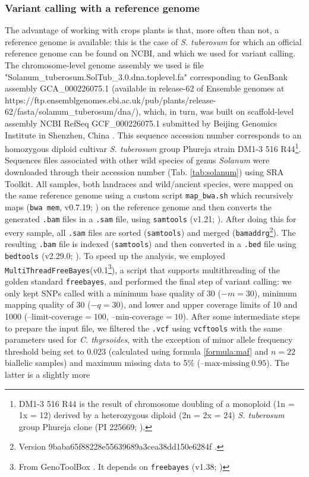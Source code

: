 \documentclass[a4paper, 12pt]{report}
\begin{document}
\subsubsection{Variant calling with a reference genome}
The advantage of working with crops plants is that, more often than not, a reference genome is available: this is the case of \textit{S. tuberosum} for which an official reference genome can be found on NCBI, and which we used for variant calling. The chromosome-level genome assembly we used is file "Solanum\_tuberosum.SolTub\_3.0.dna.toplevel.fa" corresponding to GenBank assembly GCA\_000226075.1 (available in release-62 of Ensemble genomes at https://ftp.ensemblgenomes.ebi.ac.uk/pub/plants/release-62/fasta/solanum\_tuberosum/dna/), which, in turn, was built on scaffold-level assembly NCBI RefSeq GCF\_000226075.1 submitted by Beijing Genomics Institute in Shenzhen, China \parencite{xuGenomeSequenceAnalysis2011}. This sequence accession number corresponds to an homozygous diploid cultivar \textit{S. tuberosum} group Phureja strain DM1-3 516 R44\footnote{DM1-3 516 R44 is the result of chromosome doubling of a monoploid (1n = 1x = 12) derived by a heterozygous diploid (2n = 2x = 24) \textit{S. tuberosum} group Phureja clone (PI 225669; \cite{xuGenomeSequenceAnalysis2011}).}. Sequences files associated with other wild species of genus \textit{Solanum} were downloaded through their accession number (Tab. \ref{tab:solanum}) using SRA Toolkit. All samples, both landraces and wild/ancient species, were mapped on the same reference genome using a custom script \texttt{map\_bwa.sh} which recursively maps (\texttt{bwa mem}, v0.7.19; \cite{liAligningSequenceReads2013}) on the reference genome and then converts the generated \texttt{.bam} files in a \texttt{.sam} file, using \texttt{samtools} (v1.21; \cite{danecekTwelveYearsSAMtools2021}). After doing this for every sample, all \texttt{.sam} files are sorted  (\texttt{samtools}) and merged (\texttt{bamaddrg}\footnote{Version 9baba65f88228e55639689a3cea38dd150e6284f \parencite{garrisonEkgBamaddrg2025}.}). The resulting \texttt{.bam} file is indexed (\texttt{samtools}) and then converted in a \texttt{.bed} file using \texttt{bedtools} (v2.29.0; \cite{garrisonEkgBamaddrg2025}). To speed up the analysis, we employed \texttt{MultiThreadFreeBayes}(v0.1\footnote{From GenoToolBox \parencite{bombarelyGenoToolBoxBoxGenomics2020}. It depends on \texttt{freebayes} (v1.38; \cite{garrisonHaplotypebasedVariantDetection2012})}), a script that supports multithreading of the golden standard \texttt{freebayes}, and performed the final step of variant calling: we only kept SNPs called with a minimum base quality of 30 ($-m = 30$), minimum mapping quality of 30 ($-q = 30$), and lower and upper coverage limits of 10 and 1000 ($\text{--limit-coverage} = 100$, $\text{--min-coverage} = 10$). After some intermediate steps to prepare the input file, we filtered the \texttt{.vcf} using \texttt{vcftools} with the same parameters used for \textit{C. thyrsoides}, with the exception of minor allele frequency threshold being set to 0.023 (calculated using formula \ref{formula:maf} and $n = 22$ biallelic samples) and maximum missing data to 5\% ($\text{--max-missing} \ 0.95$). The latter is a slightly more 
\end{document}
